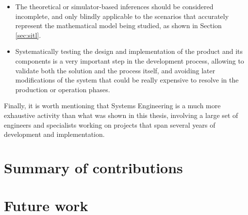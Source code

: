 \begin{itemize}
	\item The theoretical or simulator-based inferences should be considered incomplete, and only blindly applicable to the scenarios that accurately represent the mathematical model being studied, as shown in Section \ref{sec:sitl}.

	\item Systematically testing the design and implementation of the product and its components is a very important step in the development process, allowing to validate both the solution and the process itself, and avoiding later modifications of the system that could be really expensive to resolve in the production or operation phases.

\end{itemize}

Finally, it is worth mentioning that Systems Engineering is a much more exhaustive activity than what was shown in this thesis, involving a large set of engineers and specialists working on projects that span several years of development and implementation.

\section{Summary of contributions}

\section{Future work}

